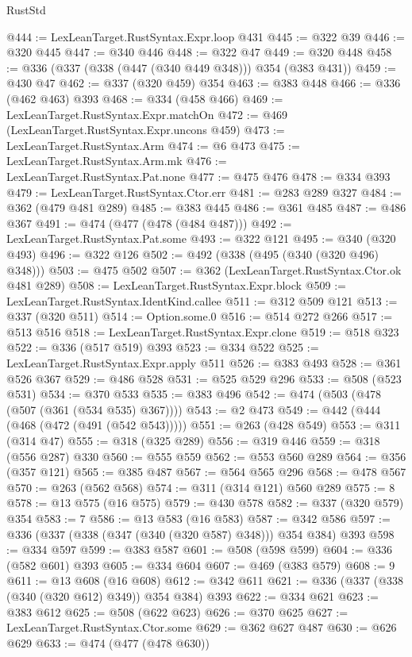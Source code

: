 \begin{lexlean}{RustStd}
\begin{coremodule}
{\begin{coremodule}
{{{{{{{{{@444 := LexLeanTarget.RustSyntax.Expr.loop @431
@445 := @322 @39
@446 := @320 @445
@447 := @340 @446
@448 := @322 @47
@449 := @320 @448
@458 := @336 (@337 (@338 (@447 (@340 @449 @348))) @354 (@383 @431))
@459 := @430 @47
@462 := @337 (@320 @459) @354
@463 := @383 @448
@466 := @336 (@462 @463) @393
@468 := @334 (@458 @466)
@469 := LexLeanTarget.RustSyntax.Expr.matchOn
@472 := @469 (LexLeanTarget.RustSyntax.Expr.uncons @459)
@473 := LexLeanTarget.RustSyntax.Arm
@474 := @6 @473
@475 := LexLeanTarget.RustSyntax.Arm.mk
@476 := LexLeanTarget.RustSyntax.Pat.none
@477 := @475 @476
@478 := @334 @393
@479 := LexLeanTarget.RustSyntax.Ctor.err
@481 := @283 @289 @327
@484 := @362 (@479 @481 @289)
@485 := @383 @445
@486 := @361 @485
@487 := @486 @367
@491 := @474 (@477 (@478 (@484 @487)))
@492 := LexLeanTarget.RustSyntax.Pat.some
@493 := @322 @121
@495 := @340 (@320 @493)
@496 := @322 @126
@502 := @492 (@338 (@495 (@340 (@320 @496) @348)))
@503 := @475 @502
@507 := @362 (LexLeanTarget.RustSyntax.Ctor.ok @481 @289)
@508 := LexLeanTarget.RustSyntax.Expr.block
@509 := LexLeanTarget.RustSyntax.IdentKind.callee
@511 := @312 @509 @121
@513 := @337 (@320 @511)
@514 := Option.some.{0}
@516 := @514 @272 @266
@517 := @513 @516
@518 := LexLeanTarget.RustSyntax.Expr.clone
@519 := @518 @323
@522 := @336 (@517 @519) @393
@523 := @334 @522
@525 := LexLeanTarget.RustSyntax.Expr.apply @511
@526 := @383 @493
@528 := @361 @526 @367
@529 := @486 @528
@531 := @525 @529 @296
@533 := @508 (@523 @531)
@534 := @370 @533
@535 := @383 @496
@542 := @474 (@503 (@478 (@507 (@361 (@534 @535) @367))))
@543 := @2 @473
@549 := @442 (@444 (@468 (@472 (@491 (@542 @543)))))
@551 := @263 (@428 @549)
@553 := @311 (@314 @47)
@555 := @318 (@325 @289)
@556 := @319 @446
@559 := @318 (@556 @287) @330
@560 := @555 @559
@562 := @553 @560 @289
@564 := @356 (@357 @121)
@565 := @385 @487
@567 := @564 @565 @296
@568 := @478 @567
@570 := @263 (@562 @568)
@574 := @311 (@314 @121) @560 @289
@575 := 8
@578 := @13 @575 (@16 @575)
@579 := @430 @578
@582 := @337 (@320 @579) @354
@583 := 7
@586 := @13 @583 (@16 @583)
@587 := @342 @586
@597 := @336 (@337 (@338 (@347 (@340 (@320 @587) @348))) @354 @384) @393
@598 := @334 @597
@599 := @383 @587
@601 := @508 (@598 @599)
@604 := @336 (@582 @601) @393
@605 := @334 @604
@607 := @469 (@383 @579)
@608 := 9
@611 := @13 @608 (@16 @608)
@612 := @342 @611
@621 := @336 (@337 (@338 (@340 (@320 @612) @349)) @354 @384) @393
@622 := @334 @621
@623 := @383 @612
@625 := @508 (@622 @623)
@626 := @370 @625
@627 := LexLeanTarget.RustSyntax.Ctor.some
@629 := @362 @627 @487
@630 := @626 @629
@633 := @474 (@477 (@478 @630))
}}}}}}}}}
\end{coremodule}}
\end{coremodule}
\end{lexlean}
